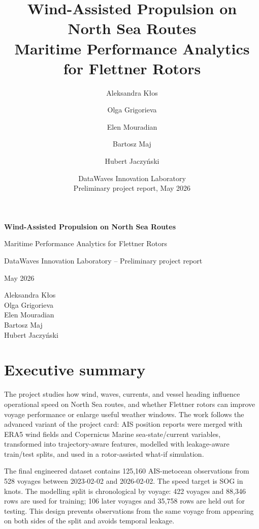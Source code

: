 \documentclass[10pt,a4paper]{article}
\title{\textbf{Wind-Assisted Propulsion on North Sea Routes}\\
\large Maritime Performance Analytics for Flettner Rotors}
\author{Aleksandra K\l{}os \and Olga Grigorieva \and Elen Mouradian \and Bartosz Maj \and Hubert Jaczy\'nski}
\date{DataWaves Innovation Laboratory \\
Preliminary project report, May 2026}
\newcommand{\sog}{SOG}
\begin{document}

\begin{titlepage}
    \centering
    \vspace*{1.2cm}
    {\Huge\bfseries Wind-Assisted Propulsion on North Sea Routes\par}
    \vspace{0.35cm}
    {\Large Maritime Performance Analytics for Flettner Rotors\par}
    \vspace{0.9cm}
    {\large DataWaves Innovation Laboratory -- Preliminary project report\par}
    \vspace{0.25cm}
    {\large May 2026\par}
    \vspace{1.2cm}
    {\large
    Aleksandra K\l{}os\\
    Olga Grigorieva\\
    Elen Mouradian\\
    Bartosz Maj\\
    Hubert Jaczy\'nski\par}
\end{titlepage}

\tableofcontents
\clearpage

\section{Executive summary}

The project studies how wind, waves, currents, and vessel heading influence
operational speed on North Sea routes, and whether Flettner rotors can improve
voyage performance or enlarge useful weather windows. The work follows the
advanced variant of the project card: AIS position reports were merged with ERA5
wind fields and Copernicus Marine sea-state/current variables, transformed into
trajectory-aware features, modelled with leakage-aware train/test splits, and
used in a rotor-assisted what-if simulation.

The final engineered dataset contains 125,160 AIS-metocean observations from
528 voyages between 2023-02-02 and 2026-02-02. The speed target is
\sog{} in knots. The modelling split is chronological by voyage: 422 voyages
and 88,346 rows are used for training; 106 later voyages and 35,758 rows are
held out for testing. This design prevents observations from the same voyage
from appearing on both sides of the split and avoids temporal leakage.
\end{document}
